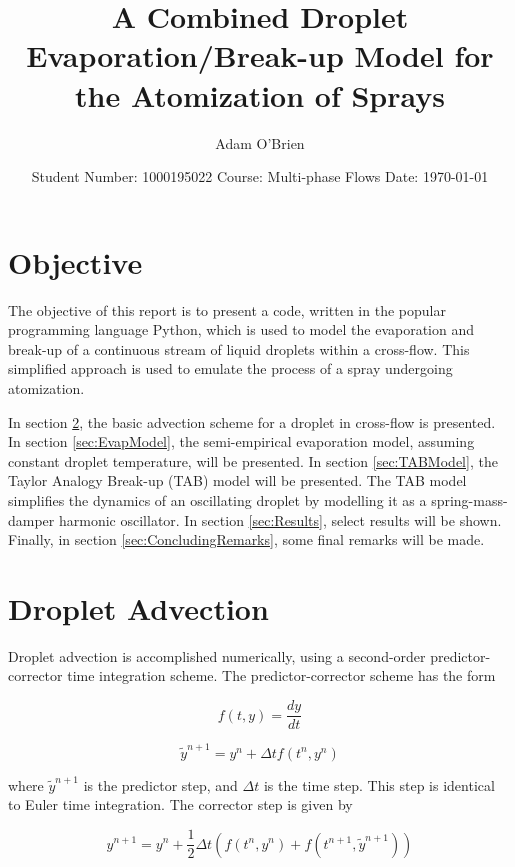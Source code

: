 \documentclass[12pt]{article}
\title{\textbf{\huge A Combined Droplet Evaporation/Break-up Model for the Atomization of Sprays}}
\author{Adam O'Brien}
\date{Student Number: 1000195022 \endgraf
Course: Multi-phase Flows \endgraf
Date: \today
}
\begin{document}
\maketitle
\newpage
\tableofcontents
\newpage

\section{Objective}

The objective of this report is to present a code, written in the popular programming language Python, which is used to model the evaporation and break-up of a continuous stream of liquid droplets within a cross-flow. This simplified approach is used to emulate the process of a spray undergoing atomization.

In section \ref{sec:DropletAdvect}, the basic advection scheme for a droplet in cross-flow is presented. In section \ref{sec:EvapModel}, the semi-empirical evaporation model, assuming constant droplet temperature, will be presented. In section \ref{sec:TABModel}, the Taylor Analogy Break-up (TAB) model will be presented. The TAB model simplifies the dynamics of an oscillating droplet by modelling it as a spring-mass-damper harmonic oscillator. In section \ref{sec:Results}, select results will be shown. Finally, in section \ref{sec:ConcludingRemarks}, some final remarks will be made.

\section {Droplet Advection}\label{sec:DropletAdvect}

Droplet advection is accomplished numerically, using a second-order predictor-corrector time integration scheme. The predictor-corrector scheme has the form

\begin{equation}
f(t, y) = \frac{dy}{dt}
\end{equation}

\begin{equation}
\tilde{y}^{n+1} = y^{n} + \Delta tf(t^{n}, y^{n})
\end{equation}

where $\tilde{y}^{n+1}$ is the predictor step, and $\Delta t$ is the time step. This step is identical to Euler time integration. The corrector step is given by

\begin{equation}
y^{n+1} = y^{n} + \frac{1}{2}\Delta t(f(t^{n}, y^{n}) + f(t^{n+1}, \tilde{y}^{n+1}))
\end{equation}
\end{document}
